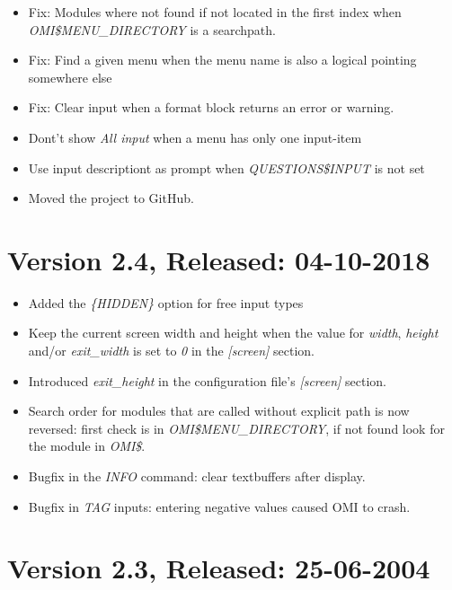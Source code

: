 \documentclass[a4paper]{book}
\begin{document}
\begin{itemize}
\item Fix: Modules where not found if not located in the first index when \textsl{OMI{\$}MENU{\_}DIRECTORY} is a searchpath.
\item Fix: Find a given menu when the menu name is also a logical pointing somewhere else
\item Fix: Clear input when a format block returns an error or warning.
\item Dont't show \textsl{All input} when a menu has only one input-item
\item Use input descriptiont as prompt when \textsl{QUESTIONS{\$}INPUT} is not set
\item Moved the project to GitHub.
\end{itemize}

\section*{Version 2.4, Released: 04-10-2018}

\begin{itemize}
\item Added the \textsl{\{HIDDEN\}} option for free input types
\item Keep the current screen width and height when the value for \textsl{width}, \textsl{height} and/or \textsl{exit{\_}width} is set to \textsl{0} in the \textsl{[screen]} section.
\item Introduced \textsl{exit{\_}height} in the configuration file's \textsl{[screen]} section.
\item Search order for modules that are called without explicit path is now reversed: first check is in \textsl{OMI{\$}MENU{\_}DIRECTORY}, if not found look for the module in \textsl{OMI{\$}}.
\item Bugfix in the \textsl{INFO} command: clear textbuffers after display.
\item Bugfix in \textsl{TAG} inputs: entering negative values caused OMI to crash.
\end{itemize}

\section*{Version 2.3, Released: 25-06-2004}
\end{document}

